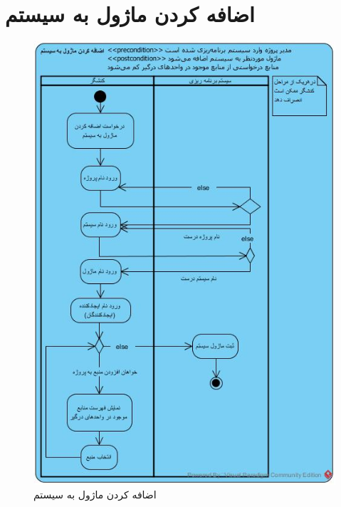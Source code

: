 \section{اضافه کردن ماژول به سیستم}
\begin{figure}[H]
	\centering
	\includegraphics[scale=0.65]{img/activity/AddModuleToSystem}
	\caption{اضافه کردن ماژول به سیستم}
\end{figure}


